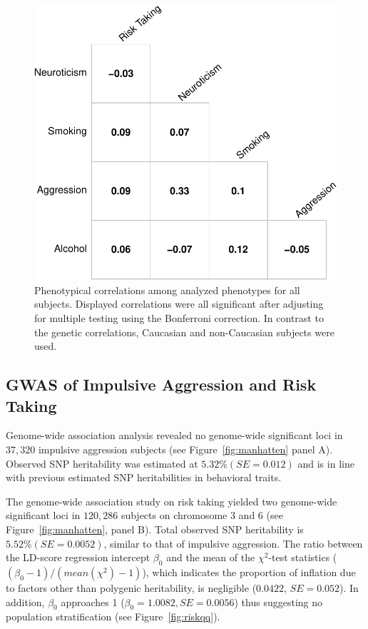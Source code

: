 \begin{figure}[htpb]
  \centering
  \includegraphics[width=0.6\linewidth]{ukb_assoc/figure/phenotype/corr_plot_ci.pdf} 
  \caption[Phenotypical correlations]{
    Phenotypical correlations among analyzed phenotypes for all subjects.
    Displayed correlations were all significant after adjusting for multiple testing using the Bonferroni correction.
    In contrast to the genetic correlations, Caucasian and non-Caucasian subjects were used.
  }\label{fig:corr_pheno}
\end{figure}

\subsection{GWAS of Impulsive Aggression and Risk Taking}
\label{sub:gwas}

Genome-wide association analysis revealed no genome-wide significant loci in $37,320$ impulsive aggression subjects (see Figure~\ref{fig:manhatten} panel A).
Observed SNP heritability was estimated at $5.32\% (SE=0.012)$ and is in line with previous estimated SNP heritabilities in behavioral traits.

The genome-wide association study on risk taking yielded two genome-wide significant loci in $120,286$ subjects on chromosome 3 and 6 (see Figure~\ref{fig:manhatten}, panel B).
Total observed SNP heritability is  $5.52\% (SE=0.0052)$, similar to that of impulsive aggression.
The ratio between the LD-score regression intercept $\beta_0$ and the mean of the $\chi^2$-test statistics ($(\beta_0 - 1)/(mean(\chi^2)-1)$),
which indicates the proportion of inflation due to factors other than polygenic heritability, is  negligible ($0.0422$, $SE=0.052$).
In addition, $\beta_0$ approaches 1 ($\beta_0=1.0082, SE=0.0056$) thus suggesting no population stratification (see Figure~\ref{fig:riskqq}).

